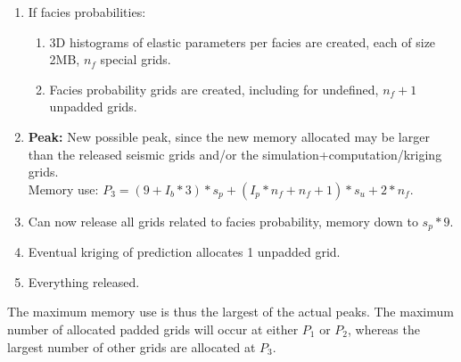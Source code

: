 \begin{enumerate}
\item If facies probabilities:
\begin{enumerate}
\item 3D histograms of elastic parameters per facies are created, each of size 2MB, $n_f$ special grids.
\item Facies probability grids are created, including for undefined, $n_f+1$ unpadded grids.
\end{enumerate}
\item {\bf Peak:} New possible peak, since the new memory allocated may be larger than the released seismic grids and/or the simulation+computation/kriging grids. \\
    Memory use: $P_3 = (9+I_b*3)*s_p+(I_p*n_f + n_f +1)*s_u + 2*n_f$.
\item Can now release all grids related to facies probability, memory down to $s_p*9$.
\item Eventual kriging of prediction allocates 1 unpadded grid.
\item Everything released.
\end{enumerate}

The maximum memory use is thus the largest of the actual peaks. The maximum number of allocated padded grids will occur at either $P_1$ or $P_2$, whereas the largest number of other grids are allocated at $P_3$. 